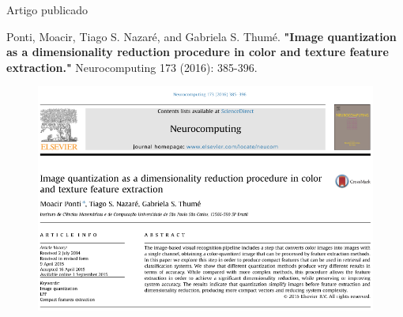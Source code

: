 \documentclass{beamer}
\begin{document}
\begin{frame}{Artigo publicado}
  \setlength\leftmargini{1em}

  \begin{block}{}
    \justifying
    \tiny{
      Ponti, Moacir, Tiago S. Nazaré, and Gabriela S. Thumé. \textbf{"Image quantization as a dimensionality reduction procedure in color and texture feature extraction."} Neurocomputing 173 (2016): 385-396.
    }
  \end{block}
  \begin{figure}
    \begin{center}
      \includegraphics[width=0.7\linewidth]{figuras/artigo.png}
    \end{center}
  \end{figure}
\end{frame}
\end{document}
